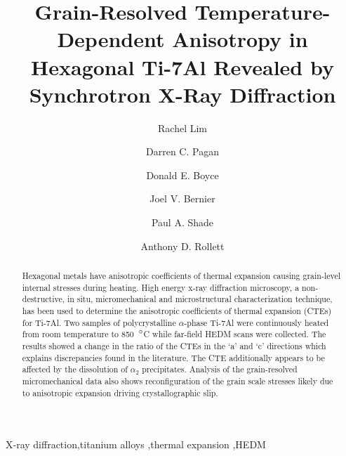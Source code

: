 \documentclass[3p]{elsarticle}
\begin{document}
	
	\begin{frontmatter}
		
		\title{Grain-Resolved Temperature-Dependent Anisotropy in Hexagonal Ti-7Al Revealed by Synchrotron X-Ray Dif{}fraction}
		
		
		\author[1]{Rachel Lim}
		
		\author[2]{Darren C. Pagan}
		\author[3]{Donald E. Boyce}
		\author[4]{Joel V. Bernier}
		\author[5]{Paul A. Shade}
		\author[1]{Anthony D. Rollett}
		
		
		
		
		\address[1]{Department of Materials Science and Engineering, Carnegie Mellon University, Pittsburgh, PA 15213, USA}
		\address[2]{Cornell High Energy Synchrotron Source, Ithaca, NY 14853, USA}
		\address[3]{Cornell University, Ithaca, NY 14850, USA}
		\address[4]{Lawrence Livermore National Laboratory, Livermore, CA 94550, USA}
		\address[5]{Air Force Research Laboratory, Wright-Patterson AFB, OH 45433, USA}
		
		\begin{abstract}
			Hexagonal metals have anisotropic coef{}ficients of thermal expansion causing grain-level internal stresses during heating. High energy x-ray dif{}fraction microscopy, a non-destructive, in situ, micromechanical and microstructural characterization technique, has been used to determine the anisotropic coef{}ficients of thermal expansion (CTEs) for Ti-7Al. Two samples of polycrystalline $\alpha$-phase Ti-7Al were continuously heated from room temperature to 850~$\degree$C while far-field HEDM scans were collected. The results showed a change in the ratio of the CTEs in the `a' and `c' directions which explains discrepancies found in the literature. The CTE additionally appears to be af{}fected by the dissolution of $\alpha_2$ precipitates. Analysis of the grain-resolved micromechanical data also shows reconfiguration of the grain scale stresses likely due to anisotropic expansion driving crystallographic slip.
		\end{abstract}
		
		\begin{keyword}
			X-ray dif{}fraction\sep titanium alloys \sep thermal expansion \sep HEDM
		\end{keyword}
		
	\end{frontmatter}
	
\end{document}
